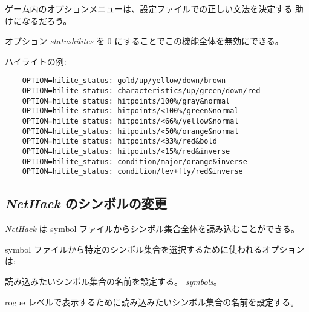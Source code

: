 ゲーム内のオプションメニューは、設定ファイルでの正しい文法を決定する
助けになるだろう。

オプション {\it statushilites} を 0 にすることでこの機能全体を無効にできる。

ハイライトの例:
\begin{verbatim}
    OPTION=hilite_status: gold/up/yellow/down/brown
    OPTION=hilite_status: characteristics/up/green/down/red
    OPTION=hilite_status: hitpoints/100%/gray&normal
    OPTION=hilite_status: hitpoints/<100%/green&normal
    OPTION=hilite_status: hitpoints/<66%/yellow&normal
    OPTION=hilite_status: hitpoints/<50%/orange&normal
    OPTION=hilite_status: hitpoints/<33%/red&bold
    OPTION=hilite_status: hitpoints/<15%/red&inverse
    OPTION=hilite_status: condition/major/orange&inverse
    OPTION=hilite_status: condition/lev+fly/red&inverse
\end{verbatim}

\subsection*{{\it NetHack\/} のシンボルの変更}

{\it NetHack\/} は symbol ファイルからシンボル集合全体を読み込むことができる。

symbol ファイルから特定のシンボル集合を選択するために使われるオプションは:

\blist{}
\item[\ib{symset}]
読み込みたいシンボル集合の名前を設定する。
{\it symbols\/}。

\item[\ib{roguesymset}]
rogue レベルで表示するために読み込みたいシンボル集合の名前を設定する。
\elist

